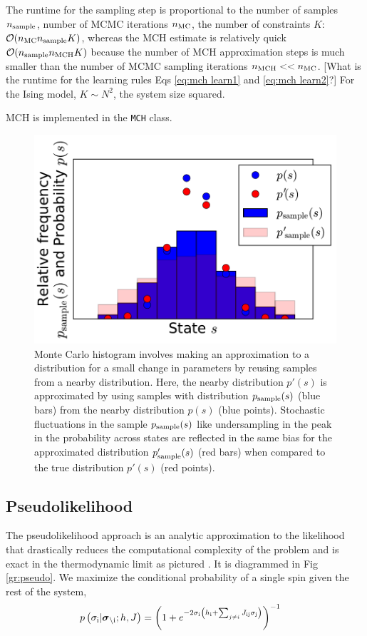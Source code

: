 \documentclass[aps,prl,twocolumn]{revtex4-1}
\begin{document}
The runtime for the sampling step is proportional to the number of samples $n_{\rm sample}$, number of MCMC iterations $n_{\rm MC}$, the number of constraints $K$:
$\mathcal{O}(n_{\rm MC} n_{\rm sample} K)$, whereas the MCH estimate is relatively quick $\mathcal{O}(n_{\rm sample}n_{\rm MCH}K)$ because the number of MCH approximation steps is much smaller than the number of MCMC sampling iterations $n_{\rm MCH}<<n_{\rm MC}$. [What is the runtime for the learning rules Eqs \ref{eq:mch learn1} and \ref{eq:mch learn2}?]
For the Ising model, $K\sim N^2$, the system size squared.

MCH is implemented in the {\tt MCH} class.

\begin{figure}[tb]\centering
	\includegraphics[width=.85\linewidth]{images/mch}
\caption{Monte Carlo histogram involves making an approximation to a distribution for a small change in parameters by reusing samples from a nearby distribution. Here, the nearby distribution $p'(s)$ is approximated by using samples with distribution $p_{\rm sample}(s)$ (blue bars) from the nearby distribution $p(s)$ (blue points). Stochastic fluctuations in the sample $p_{\rm sample}(s)$ like undersampling in the peak in the probability across states are reflected in the same bias for the approximated distribution $p_{\rm sample}'(s)$ (red bars) when compared to the true distribution $p'(s)$ (red points).}
\label{gr:mch}
\end{figure}


\subsection{Pseudolikelihood}
The pseudolikelihood approach is an analytic approximation to the likelihood that drastically reduces the computational complexity of the problem and is exact in the thermodynamic limit as pictured \cite{Aurell:2012hi}. It is diagrammed in Fig \ref{gr:pseudo}. We maximize the conditional probability of a single spin given the rest of the system,
\begin{align}
	p\left(\sigma_{\rm i}|\boldsymbol{\sigma}_{\backslash \rm i};h,J\right) &= \left( 1+e^{-2\sigma_{\rm i} \left(h_{\rm i}+\sum_{j\neq i}J_{\rm ij}\sigma_{\rm j}\right)} \right)^{-1}
\end{align}
\end{document}
